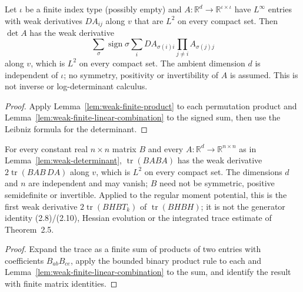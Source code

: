 \begin{lemma}
  \label{lem:weak-determinant}
  \leanok
  Let $\iota$ be a finite index type (possibly empty) and $A:\mathbb R^d\to\mathbb R^{\iota\times\iota}$ have $L^\infty$ entries with
  weak derivatives $DA_{ij}$ along $v$ that are $L^2$ on every compact set. Then $\det A$ has the weak derivative
  \[
    \sum_{\sigma}\operatorname{sign}\sigma\sum_{i}DA_{\sigma(i)i}\prod_{j\ne i}A_{\sigma(j)j}
  \]
  along $v$, which is $L^2$ on every compact set. The ambient dimension $d$ is independent of $\iota$; no symmetry, positivity or
  invertibility of $A$ is assumed. This is not inverse or log-determinant calculus.
\end{lemma}
\begin{proof}
  \leanok
  Apply Lemma~\ref{lem:weak-finite-product} to each permutation product and Lemma~\ref{lem:weak-finite-linear-combination} to the
  signed sum, then use the Leibniz formula for the determinant.
\end{proof}

\begin{lemma}
  \label{lem:weak-trace-quadratic}
  \leanok
  For every constant real $n\times n$ matrix $B$ and every $A:\mathbb R^d\to\mathbb R^{n\times n}$ as in
  Lemma~\ref{lem:weak-determinant}, $\operatorname{tr}(BABA)$ has the weak derivative $2\operatorname{tr}(BAB\,DA)$ along $v$, which
  is $L^2$ on every compact set. The dimensions $d$ and $n$ are independent and may vanish; $B$ need not be symmetric, positive
  semidefinite or invertible. Applied to the regular moment potential, this is the first weak derivative
  $2\operatorname{tr}(BHBT_k)$ of $\operatorname{tr}(BHBH)$; it is not the generator identity (2.8)/(2.10), Hessian evolution or
  the integrated trace estimate of Theorem~2.5.
\end{lemma}
\begin{proof}
  \leanok
  Expand the trace as a finite sum of products of two entries with coefficients $B_{ab}B_{ce}$, apply the bounded binary product rule
  to each and Lemma~\ref{lem:weak-finite-linear-combination} to the sum, and identify the result with finite matrix identities.
\end{proof}

